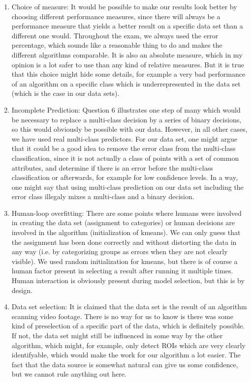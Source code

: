 \documentclass{article}
\begin{document}
\begin{enumerate}
\item Choice of measure: It would be possible to make our results look better by choosing different performance measures, since there will always be a performance measure that yields a better result on a specific data set than a different one would. Throughout the exam, we always used the error percentage, which sounds like a reasonable thing to do and makes the different algorithms comparable. It is also an absolute measure, which in my opinion is a lot safer to use than any kind of relative measures. But it is true that this choice might hide some details, for example a very bad performance of an algorithm on a specific class which is underrepresented in the data set (which is the case in our data sets).
\item Incomplete Prediction: Question 6 illustrates one step of many which would be necessary to replace a multi-class decision by a series of binary decisions, so this would obviously be possible with our data. However, in all other cases, we have used real multi-class predictors. For our data set, one might argue that it could be a good idea to remove the error class from the multi-class classification, since it is not actually a class of points with a set of common attributes, and determine if there is an error before the multi-class classification or afterwards, for example for low confidence levels. In a way, one might say that using multi-class prediction on our data set including the error class illegaly mixes a multi-class and a binary decision.
\item Human-loop overfitting: There are some points where humans were involved in creating the data set (assignment to categories) or human decisions are involved in the algorithm (initialization of kmeans). We can only guess that the assignment has been done correctly and without distorting the data in any way (i.e. by categorizing groups as errors when they are not clearly visible). We used random initialization for kmeans, but there is of course a human factor present in selecting a result after running it multiple times. Human interaction is obviously present during model selection, but this is by design.
\item Data set selection: It is claimed that the data set is the result of an algorithm scanning video footage. There is no way for us to know is there was some kind of preselection of a specific part of the data, which is definitely possible. If not, the data set might still be influenced in some way by the other algorithm, which might, for example, only detect ROIs which are very clearly identifyable, which would make the work for our algorithm a lot easier. The fact that the data source is somewhat natural can give us some confidence, but we cannot rule anything out here.

\end{enumerate}
\end{document}
